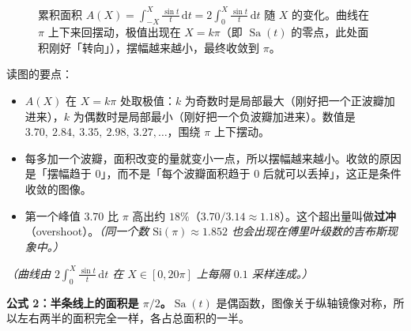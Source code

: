 \documentclass[UTF8,a4paper,11pt]{ctexart}
\newcommand{\Sa}{\operatorname{Sa}}
\renewcommand{\d}{\,\mathrm{d}}
\newcounter{ex}[section]
\begin{document}
\begin{figure}[H]
\caption{累积面积 $A(X)=\displaystyle\int_{-X}^{X}\frac{\sin t}{t}\d t=2\int_0^X\frac{\sin t}{t}\d t$ 随 $X$ 的变化。曲线在 $\pi$ 上下来回摆动，极值出现在 $X=k\pi$（即 $\Sa(t)$ 的零点，此处面积刚好「转向」），摆幅越来越小，最终收敛到 $\pi$。}
\end{figure}

读图的要点：
\begin{itemize}[nosep]
\item $A(X)$ 在 $X=k\pi$ 处取极值：$k$ 为奇数时是局部最大（刚好把一个正波瓣加进来），$k$ 为偶数时是局部最小（刚好把一个负波瓣加进来）。数值是 $3.70,\ 2.84,\ 3.35,\ 2.98,\ 3.27,\dots$，围绕 $\pi$ 上下摆动。
\item 每多加一个波瓣，面积改变的量就变小一点，所以摆幅越来越小。收敛的原因是「摆幅趋于 $0$」，而不是「每个波瓣面积趋于 $0$ 后就可以丢掉」，这正是条件收敛的图像。
\item 第一个峰值 $3.70$ 比 $\pi$ 高出约 $18\%$（$3.70/3.14\approx1.18$）。这个超出量叫做\textbf{过冲}（overshoot）。\emph{（同一个数 $\mathrm{Si}(\pi)\approx1.852$ 也会出现在傅里叶级数的吉布斯现象中。）}
\end{itemize}
\emph{（曲线由 $2\int_0^X\frac{\sin t}{t}\d t$ 在 $X\in[0,20\pi]$ 上每隔 $0.1$ 采样连成。）}

\textbf{公式 2：半条线上的面积是 $\pi/2$。}$\Sa(t)$ 是偶函数，图像关于纵轴镜像对称，所以左右两半的面积完全一样，各占总面积的一半。
\end{document}
